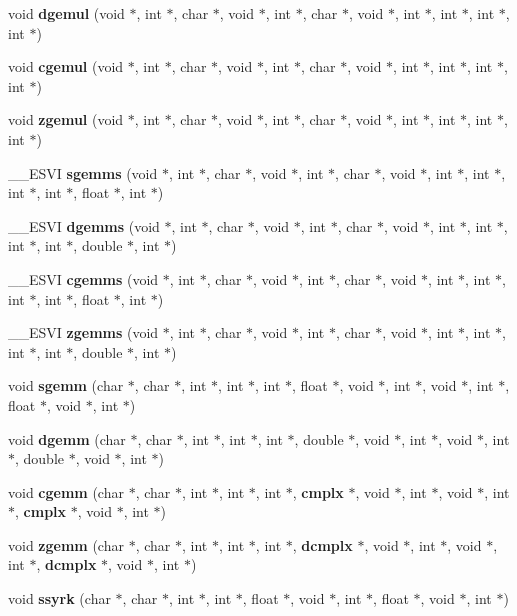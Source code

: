 \begin{CompactItemize}
\item 
void {\bf dgemul} (void $\ast$, int $\ast$, char $\ast$, void $\ast$, int $\ast$, char $\ast$, void $\ast$, int $\ast$, int $\ast$, int $\ast$, int $\ast$)
\item 
void {\bf cgemul} (void $\ast$, int $\ast$, char $\ast$, void $\ast$, int $\ast$, char $\ast$, void $\ast$, int $\ast$, int $\ast$, int $\ast$, int $\ast$)
\item 
void {\bf zgemul} (void $\ast$, int $\ast$, char $\ast$, void $\ast$, int $\ast$, char $\ast$, void $\ast$, int $\ast$, int $\ast$, int $\ast$, int $\ast$)
\item 
\_\-\_\-ESVI {\bf sgemms} (void $\ast$, int $\ast$, char $\ast$, void $\ast$, int $\ast$, char $\ast$, void $\ast$, int $\ast$, int $\ast$, int $\ast$, int $\ast$, float $\ast$, int $\ast$)
\item 
\_\-\_\-ESVI {\bf dgemms} (void $\ast$, int $\ast$, char $\ast$, void $\ast$, int $\ast$, char $\ast$, void $\ast$, int $\ast$, int $\ast$, int $\ast$, int $\ast$, double $\ast$, int $\ast$)
\item 
\_\-\_\-ESVI {\bf cgemms} (void $\ast$, int $\ast$, char $\ast$, void $\ast$, int $\ast$, char $\ast$, void $\ast$, int $\ast$, int $\ast$, int $\ast$, int $\ast$, float $\ast$, int $\ast$)
\item 
\_\-\_\-ESVI {\bf zgemms} (void $\ast$, int $\ast$, char $\ast$, void $\ast$, int $\ast$, char $\ast$, void $\ast$, int $\ast$, int $\ast$, int $\ast$, int $\ast$, double $\ast$, int $\ast$)
\item 
void {\bf sgemm} (char $\ast$, char $\ast$, int $\ast$, int $\ast$, int $\ast$, float $\ast$, void $\ast$, int $\ast$, void $\ast$, int $\ast$, float $\ast$, void $\ast$, int $\ast$)
\item 
void {\bf dgemm} (char $\ast$, char $\ast$, int $\ast$, int $\ast$, int $\ast$, double $\ast$, void $\ast$, int $\ast$, void $\ast$, int $\ast$, double $\ast$, void $\ast$, int $\ast$)
\item 
void {\bf cgemm} (char $\ast$, char $\ast$, int $\ast$, int $\ast$, int $\ast$, {\bf cmplx} $\ast$, void $\ast$, int $\ast$, void $\ast$, int $\ast$, {\bf cmplx} $\ast$, void $\ast$, int $\ast$)
\item 
void {\bf zgemm} (char $\ast$, char $\ast$, int $\ast$, int $\ast$, int $\ast$, {\bf dcmplx} $\ast$, void $\ast$, int $\ast$, void $\ast$, int $\ast$, {\bf dcmplx} $\ast$, void $\ast$, int $\ast$)
\item 
void {\bf ssyrk} (char $\ast$, char $\ast$, int $\ast$, int $\ast$, float $\ast$, void $\ast$, int $\ast$, float $\ast$, void $\ast$, int $\ast$)

\end{CompactItemize}
